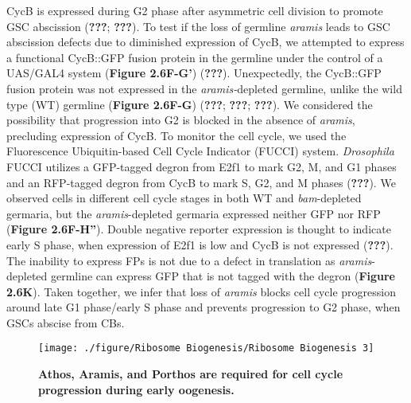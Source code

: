 \documentclass[12pt,oneside]{reedthesis}
\begin{document}
CycB is expressed during G2 phase after asymmetric cell division to promote GSC abscission ({\textbf{???}}; {\textbf{???}}). To test if the loss of germline \emph{aramis} leads to GSC abscission defects due to diminished expression of CycB, we attempted to express a functional CycB::GFP fusion protein in the germline under the control of a UAS/GAL4 system (\textbf{Figure 2.6F-G'}) ({\textbf{???}}). Unexpectedly, the CycB::GFP fusion protein was not expressed in the \emph{aramis-}depleted germline, unlike the wild type (WT) germline (\textbf{Figure 2.6F-G}) ({\textbf{???}}; {\textbf{???}}; {\textbf{???}}). We considered the possibility that progression into G2 is blocked in the absence of \emph{aramis}, precluding expression of CycB. To monitor the cell cycle, we used the Fluorescence Ubiquitin-based Cell Cycle Indicator (FUCCI) system. \emph{Drosophila} FUCCI utilizes a GFP-tagged degron from E2f1 to mark G2, M, and G1 phases and an RFP-tagged degron from CycB to mark S, G2, and M phases ({\textbf{???}}). We observed cells in different cell cycle stages in both WT and \emph{bam}-depleted germaria, but the \emph{aramis}-depleted germaria expressed neither GFP nor RFP (\textbf{Figure 2.6F-H''}). Double negative reporter expression is thought to indicate early S phase, when expression of E2f1 is low and CycB is not expressed ({\textbf{???}}). The inability to express FPs is not due to a defect in translation as \emph{aramis}-depleted germline can express GFP that is not tagged with the degron (\textbf{Figure 2.6K}). Taken together, we infer that loss of \emph{aramis} blocks cell cycle progression around late G1 phase/early S phase and prevents progression to G2 phase, when GSCs abscise from CBs.
\begin{figure}

{\centering \texttt{[image: ./figure/Ribosome Biogenesis/Ribosome Biogenesis 3]} 

}

\caption[\textbf{Athos, Aramis, and Porthos are required for cell cycle progression during early oogenesis.}]{\textbf{Athos, Aramis, and Porthos are required for cell cycle progression during early oogenesis.}}\label{fig:unnamed-chunk-10}
\end{figure}
\end{document}
